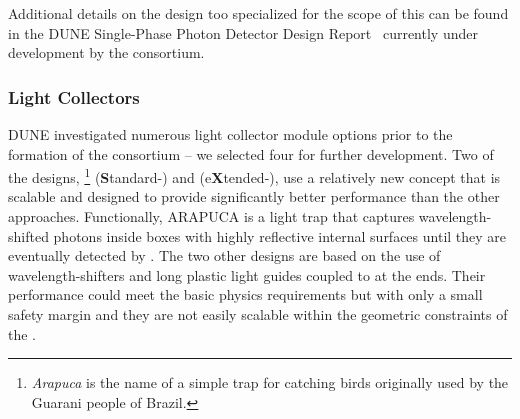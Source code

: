 Additional details on the design too specialized for the scope of this  can be found in the DUNE Single-Phase Photon Detector Design Report~  
 currently under development by the consortium. 
 


\subsubsection{Light Collectors} 
\label{sssec:photoncollectors}

DUNE investigated numerous  light collector module options prior to the formation of the \single {} consortium -- we selected four for further development. 
Two of the designs, \footnote{\textit{Arapuca} is the name of a simple trap for catching birds originally used by the Guarani people of Brazil.} (\textbf{S}tandard-) and  (e\textbf{X}tended-), use a relatively new concept that is scalable and designed to provide  
significantly better performance than the other approaches. Functionally, ARAPUCA is a light trap that captures wavelength-shifted photons inside boxes with highly reflective internal surfaces until they are eventually detected by .  The two other designs are based on the use of wavelength-shifters and long plastic light guides coupled to  at the ends. Their performance could meet the basic physics requirements but with only a small safety margin and they are not easily scalable within the geometric constraints of the . 

